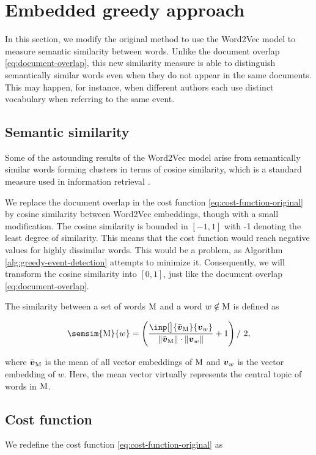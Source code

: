 \section{Embedded greedy approach}
In this section, we modify the original method to use the Word2Vec model to measure semantic similarity between words. Unlike the document overlap \eqref{eq:document-overlap}, this new similarity measure is able to distinguish semantically similar words even when they do not appear in the same documents. This may happen, for instance, when different authors each use distinct vocabulary when referring to the same event.


\subsection{Semantic similarity}
Some of the astounding results of the Word2Vec model arise from semantically similar words forming clusters \citep{linguistic-regularities} in terms of cosine similarity, which is a standard measure used in information retrieval \citep{information-retrieval, cosine-similarity}.

We replace the document overlap in the cost function \eqref{eq:cost-function-original} by cosine similarity between Word2Vec embeddings, though with a small modification. The cosine similarity is bounded in $[-1, 1]$ with -1 denoting the least degree of similarity. This means that the cost function would reach negative values for highly dissimilar words. This would be a problem, as Algorithm \ref{alg:greedy-event-detection} attempts to minimize it. Consequently, we will transform the cosine similarity into $[0, 1]$, just like the document overlap \eqref{eq:document-overlap}.

The similarity between a set of words $\text{M}$ and a word $w \notin \text{M}$ is defined as

\begin{equation}
	\semsim{\featset}{w} = \left( \frac{\inp[\big]{\bar{\embed}_{\featset}}{\embed_{w}}}{\| \bar{\embed}_{\featset} \| \cdot \| \embed_{w} \|} + 1 \right) /\ 2,
\end{equation}

where $\bar{\embed}_{\featset}$ is the mean of all vector embeddings of $\text{M}$ and $\embed_{w}$ is the vector embedding of $w$. Here, the mean vector virtually represents the central topic of words in $\text{M}$.


\subsection{Cost function}
We redefine the cost function \eqref{eq:cost-function-original} as

